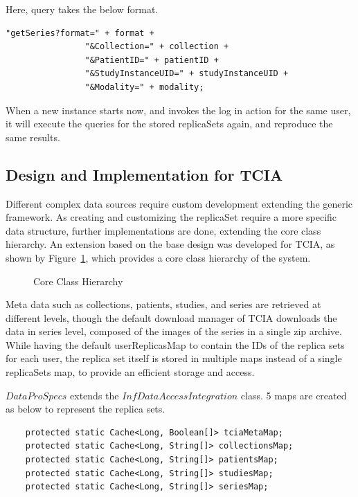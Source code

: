 \documentclass[conference]{IEEEtran}
\begin{document}
Here, query takes the below format. 
\begin{lstlisting}  
"getSeries?format=" + format +
                "&Collection=" + collection +
                "&PatientID=" + patientID +
                "&StudyInstanceUID=" + studyInstanceUID +
                "&Modality=" + modality;
\end{lstlisting}  
When a new instance starts now, and invokes the log in action for the same user, it will execute the queries for the stored replicaSets again, and reproduce the same results.

\subsection{Design and Implementation for TCIA}
Different complex data sources require custom development extending the generic framework. As creating and customizing the replicaSet require a more specific data structure, further implementations are done, extending the core class hierarchy. An extension based on the base design was developed for TCIA, as shown by Figure~\ref{fig:class}, which provides a core class hierarchy of the system.
\begin{figure}[!htbp]
\begin{center}
\end{center}
 \caption{Core Class Hierarchy}
 \label{fig:class}
\end{figure}

Meta data such as collections, patients, studies, and series are retrieved at different levels, though the default download manager of TCIA downloads the data in series level, composed of the images of the series in a single zip archive. While having the default userReplicasMap to contain the IDs of the replica sets for each user, the replica set itself is stored in multiple maps instead of a single replicaSets map, to provide an efficient storage and access.

$DataProSpecs$ extends the $InfDataAccessIntegration$ class. 5 maps are created as below to represent the replica sets.
\begin{lstlisting}  
    protected static Cache<Long, Boolean[]> tciaMetaMap;
    protected static Cache<Long, String[]> collectionsMap;
    protected static Cache<Long, String[]> patientsMap;
    protected static Cache<Long, String[]> studiesMap;
    protected static Cache<Long, String[]> seriesMap;
\end{lstlisting} 
\end{document}

